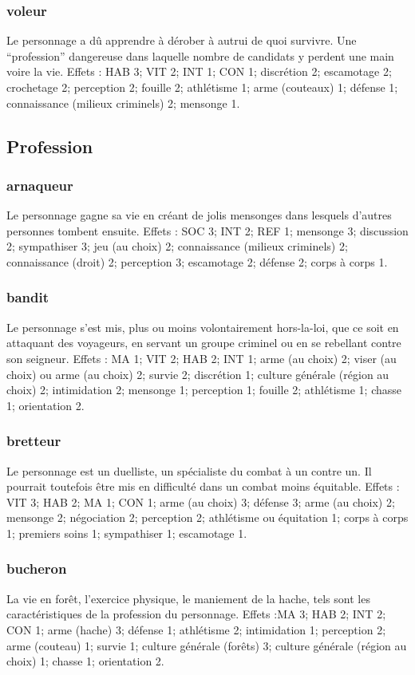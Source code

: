 \documentclass[10pt,a4paper,twocolumn]{book}
\begin{document}
\subsubsection{voleur}
Le personnage a dû apprendre à dérober à autrui de quoi survivre. Une “profession” dangereuse dans laquelle nombre de candidats y perdent une main voire la vie.
Effets : HAB 3; VIT 2; INT 1; CON 1; discrétion 2; escamotage 2; crochetage 2; perception 2; fouille 2; athlétisme 1; arme (couteaux) 1; défense 1; connaissance (milieux criminels) 2; mensonge 1.

\subsection{Profession}
\subsubsection{arnaqueur}
Le personnage gagne sa vie en créant de jolis mensonges dans lesquels d’autres personnes tombent ensuite.
Effets : SOC 3; INT 2; REF 1; mensonge 3; discussion 2; sympathiser 3; jeu (au choix) 2; connaissance (milieux criminels) 2; connaissance (droit) 2; perception 3; escamotage 2; défense 2; corps à corps 1.
\subsubsection{bandit}
Le personnage s’est mis, plus ou moins volontairement hors-la-loi, que ce soit en attaquant des voyageurs, en servant un groupe criminel ou en se rebellant contre son seigneur.
Effets : MA 1; VIT 2; HAB 2; INT 1; arme (au choix) 2; viser (au choix) ou arme (au choix) 2; survie 2; discrétion 1; culture générale (région au choix) 2; intimidation 2; mensonge 1; perception 1; fouille 2; athlétisme 1; chasse 1; orientation 2.
\subsubsection{bretteur}
Le personnage est un duelliste, un spécialiste du combat à un contre un. Il pourrait toutefois être mis en difficulté dans un combat moins équitable.
Effets : VIT 3; HAB 2; MA 1; CON 1; arme (au choix) 3; défense 3; arme (au choix) 2; mensonge 2; négociation 2; perception 2; athlétisme ou équitation 1; corps à corps 1; premiers soins 1; sympathiser 1; escamotage 1.
\subsubsection{bucheron}
La vie en forêt, l’exercice physique,  le maniement de la hache, tels sont les caractéristiques de la profession du personnage.
Effets :MA 3; HAB 2; INT 2; CON 1; arme (hache) 3; défense 1; athlétisme 2; intimidation 1; perception 2; arme (couteau) 1; survie 1; culture générale (forêts) 3; culture générale (région au choix) 1; chasse 1; orientation 2.
\end{document}
